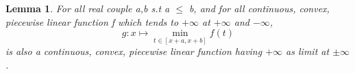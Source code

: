 \documentclass{article}
\newtheorem{corollary}{Corollary}
\newtheorem{lemma}{Lemma}
\begin{document}


\begin{lemma} \label{lem:important} 
    For all real couple a,b s.t a $\leqslant$ b, and for all continuous, convex, 
    piecewise linear function f which tends to $+\infty$ at $+\infty$ and 
    $-\infty$, \[ g : x\mapsto \min_{t\in[x+a, x+b]}f(t) \] is also a continuous, 
    convex, piecewise linear function having $+\infty$ as limit at $\pm\infty$.
\end{lemma}
\end{document}
